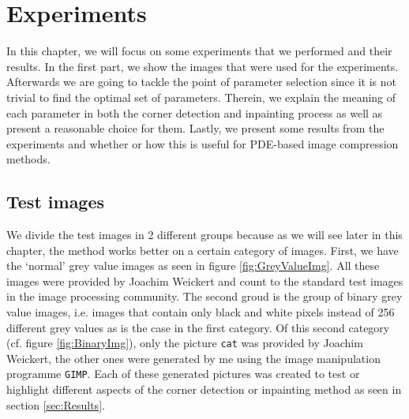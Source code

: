\chapter{Experiments}\label{ch:Experiments} 
In this chapter, we will focus on some experiments that we performed and their results.
In the first part, we show the images that were used for the experiments. Afterwards we are going
to tackle the point of parameter selection since it is not trivial to find the optimal set of
parameters. Therein, we explain the meaning of each parameter in both the corner detection and
inpainting process as well as present a reasonable choice for them.
Lastly, we present some results from the experiments and whether or how this is useful for
PDE-based image compression methods.
\section{Test images}
We divide the test images in 2 different groups because as we will see later in this chapter, the
method works better on a certain category of images.
First, we have the `normal' grey value images as seen in figure \ref{fig:GreyValueImg}. All these
images were provided by Joachim Weickert and count to the standard test images in the image
processing community.
The second groud is the group of binary grey value images, i.e. images that contain only black and
white pixels instead of 256 different grey values as is the case in the first category. Of this
second category (cf. figure \ref{fig:BinaryImg}), only the picture \texttt{cat} was provided by
Joachim Weickert, the other ones were generated by me using the image manipulation programme
\texttt{GIMP}. Each of these generated pictures was created to test or highlight different aspects
of the corner detection or inpainting method as seen in section \ref{sec:Results}.
